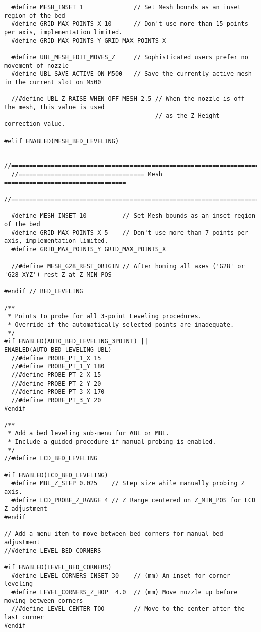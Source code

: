 \begin{lstlisting}
  #define MESH_INSET 1              // Set Mesh bounds as an inset region of the bed
  #define GRID_MAX_POINTS_X 10      // Don't use more than 15 points per axis, implementation limited.
  #define GRID_MAX_POINTS_Y GRID_MAX_POINTS_X

  #define UBL_MESH_EDIT_MOVES_Z     // Sophisticated users prefer no movement of nozzle
  #define UBL_SAVE_ACTIVE_ON_M500   // Save the currently active mesh in the current slot on M500

  //#define UBL_Z_RAISE_WHEN_OFF_MESH 2.5 // When the nozzle is off the mesh, this value is used
                                          // as the Z-Height correction value.

#elif ENABLED(MESH_BED_LEVELING)

  //===========================================================================
  //=================================== Mesh ==================================
  //===========================================================================

  #define MESH_INSET 10          // Set Mesh bounds as an inset region of the bed
  #define GRID_MAX_POINTS_X 5    // Don't use more than 7 points per axis, implementation limited.
  #define GRID_MAX_POINTS_Y GRID_MAX_POINTS_X

  //#define MESH_G28_REST_ORIGIN // After homing all axes ('G28' or 'G28 XYZ') rest Z at Z_MIN_POS

#endif // BED_LEVELING

/**
 * Points to probe for all 3-point Leveling procedures.
 * Override if the automatically selected points are inadequate.
 */
#if ENABLED(AUTO_BED_LEVELING_3POINT) || ENABLED(AUTO_BED_LEVELING_UBL)
  //#define PROBE_PT_1_X 15
  //#define PROBE_PT_1_Y 180
  //#define PROBE_PT_2_X 15
  //#define PROBE_PT_2_Y 20
  //#define PROBE_PT_3_X 170
  //#define PROBE_PT_3_Y 20
#endif

/**
 * Add a bed leveling sub-menu for ABL or MBL.
 * Include a guided procedure if manual probing is enabled.
 */
//#define LCD_BED_LEVELING

#if ENABLED(LCD_BED_LEVELING)
  #define MBL_Z_STEP 0.025    // Step size while manually probing Z axis.
  #define LCD_PROBE_Z_RANGE 4 // Z Range centered on Z_MIN_POS for LCD Z adjustment
#endif

// Add a menu item to move between bed corners for manual bed adjustment
//#define LEVEL_BED_CORNERS

#if ENABLED(LEVEL_BED_CORNERS)
  #define LEVEL_CORNERS_INSET 30    // (mm) An inset for corner leveling
  #define LEVEL_CORNERS_Z_HOP  4.0  // (mm) Move nozzle up before moving between corners
  //#define LEVEL_CENTER_TOO        // Move to the center after the last corner
#endif


\end{lstlisting}
